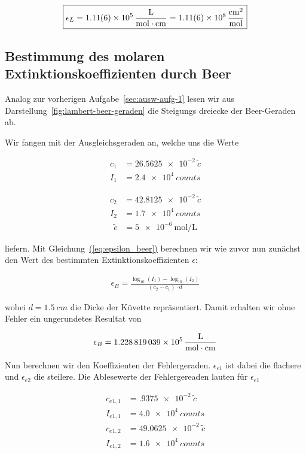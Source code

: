 \documentclass{article}
\let\OrigRef\ref
\renewcommand{\ref}[1]{{\color{linkblue}\uline{\OrigRef{#1}}}}
\renewcommand{\eqref}[1]{{\color{linkblue}\uline{\textup{(\OrigRef{#1})}}}}
\begin{document}
\begin{align}
	\boxed{
		\epsilon_L = \SI{1.11(6)e5}{\frac{\liter}{\mol \cdot cm}} = \qty{1.11(6)e8}{\frac{cm^2}{\mol}}
	}
	\label{eq:res-lambert}
	\end{align}

\subsection{Bestimmung des molaren Extinktionskoeffizienten durch Beer}
\label{sec:ausw-aufg-2}

Analog zur vorherigen Aufgabe~\ref{sec:ausw-aufg-1} lesen wir aus 
Darstellung~\ref{fig:lambert-beer-geraden} die Steigungs dreiecke der Beer-Geraden
ab.

Wir fangen mit der Ausgleichsgeraden an, welche uns die Werte

\begin{align}
	c_1 &= \qty{26.5625e-2}{\tilde{c}}\\
	I_1 &= \qty{2.4e4}{counts}
\end{align}

\begin{align}
	c_2 &= \qty{42.8125e-2}{\tilde{c}}\\
	I_2 &= \qty{1.7e4}{counts}
\end{align}
\begin{align}
	\tilde{c} &= \qty{5e-6}{\mole \per \liter}
\end{align}

liefern.
Mit Gleichung~\eqref{eq:epsilon_beer} berechnen wir wie zuvor nun zunächst den Wert
des bestimmten Extinktionskoeffizienten $\epsilon$:

\begin{align}
	\epsilon_B = \frac{
		\log_{10}(I_1) - \log_{10}(I_2)
	} {
		(c_2 - c_1) \cdot d
	}
\end{align}

wobei $d = \qty{1.5}{cm}$ die Dicke der Küvette repräsentiert.
Damit erhalten wir ohne Fehler ein ungerundetes Resultat von

\begin{align}
		\epsilon_B = \qty{1.228819039e5}{\frac{\liter}{\mol \cdot cm}}
\end{align}

Nun berechnen wir den Koeffizienten der Fehlergeraden. $\epsilon_{e1}$ ist 
dabei die flachere und $\epsilon_{e2}$ die steilere. Die Ablesewerte der 
Fehlergereaden lauten für $\epsilon_{e1}$

\begin{align}%
	c_{e1,1} &= \qty{.9375e-2}{\tilde{c}}\\
	I_{e1,1} &= \qty{4.0e4}{counts}\\
	c_{e1,2} &= \qty{49.0625e-2}{\tilde{c}}\\
	I_{e1,2} &= \qty{1.6e4}{counts}\\
\end{align}
\end{document}
